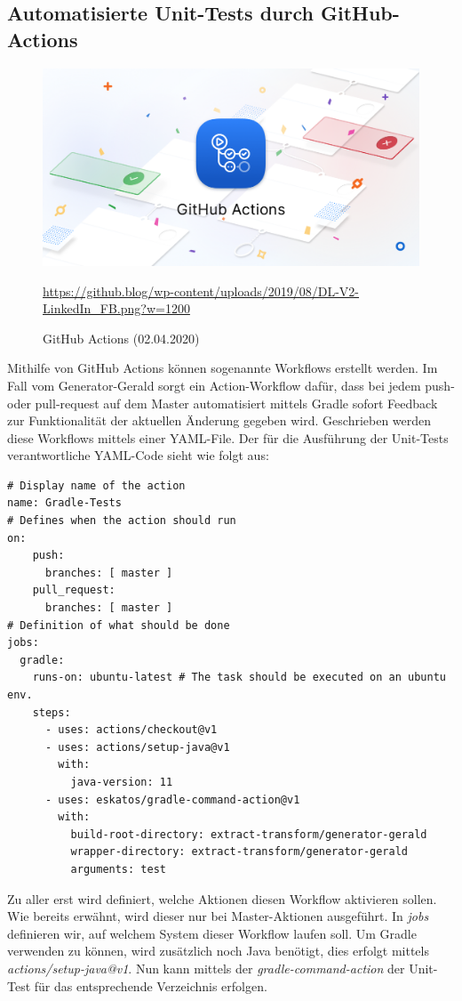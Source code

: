 \subsection{Automatisierte Unit-Tests durch GitHub-Actions}
\begin{figure}[H]
    \centering
    \includegraphics[scale=0.2]{images/github-actions.png}
    \caption{GitHub Actions (02.04.2020)}
    \label{img:}
    \url{https://github.blog/wp-content/uploads/2019/08/DL-V2-LinkedIn_FB.png?w=1200}
\end{figure}
Mithilfe von GitHub Actions können sogenannte Workflows erstellt werden. Im Fall vom Generator-Gerald sorgt ein Action-Workflow dafür, dass bei jedem push- oder pull-request auf dem Master automatisiert mittels Gradle sofort Feedback zur Funktionalität der aktuellen Änderung gegeben wird. Geschrieben werden diese Workflows mittels einer YAML-File. Der für die Ausführung der Unit-Tests verantwortliche YAML-Code sieht wie folgt aus:
\begin{lstlisting}[caption={Gradle Unit-Test Action}]
# Display name of the action
name: Gradle-Tests
# Defines when the action should run
on:
    push:
      branches: [ master ]
    pull_request:
      branches: [ master ]
# Definition of what should be done
jobs:
  gradle:
    runs-on: ubuntu-latest # The task should be executed on an ubuntu env.
    steps:
      - uses: actions/checkout@v1
      - uses: actions/setup-java@v1
        with:
          java-version: 11
      - uses: eskatos/gradle-command-action@v1
        with:
          build-root-directory: extract-transform/generator-gerald
          wrapper-directory: extract-transform/generator-gerald
          arguments: test
\end{lstlisting}
\vspace{4mm}\par
 Zu aller erst  wird definiert, welche Aktionen diesen Workflow aktivieren sollen. Wie bereits erwähnt, wird dieser nur bei Master-Aktionen ausgeführt. In \textit{jobs} definieren wir, auf welchem System dieser Workflow laufen soll. Um Gradle verwenden zu können, wird zusätzlich noch Java benötigt, dies erfolgt mittels \textit{actions/setup-java@v1}. Nun kann mittels der \textit{gradle-command-action} der Unit-Test für das entsprechende Verzeichnis erfolgen.
